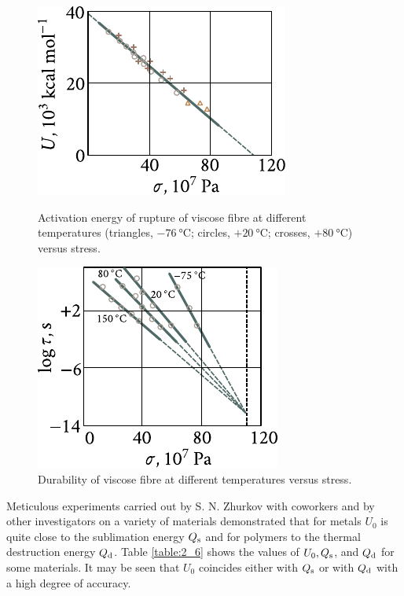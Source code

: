 \begin{figure}[t]
	\begin{minipage}[t]{0.48\linewidth}
		\begin{center}
			\includegraphics[scale=1]{figures/ch_02/fig_2_30.pdf}
			\caption[]{Activation energy of rupture of viscose fibre at different temperatures (triangles, $-\SI{76}{\degreeCelsius}$; circles, $+\SI{20}{\degreeCelsius}$; crosses, $+\SI{80}{\degreeCelsius}$) versus stress.}
			\label{fig:2_30}
		\end{center}
	\end{minipage}
	\hfill{ }%
	\begin{minipage}[t]{0.48\linewidth}
		\begin{center}
			\includegraphics[scale=1]{figures/ch_02/fig_2_31.pdf}
			\caption[]{Durability of viscose fibre at different temperatures versus stress.}
			\label{fig:2_31}
		\end{center}
	\end{minipage}
\vspace{-0.3cm}
\end{figure}

Meticulous experiments carried out by S. N. Zhurkov with coworkers and by other investigators on a variety of materials demonstrated that for metals $U_0$ is quite close to the sublimation energy $Q_{\text{s}}$ and for polymers to the thermal destruction energy $Q_{\text{d}}$. Table \ref{table:2_6} shows the values of $U_0, Q_{\text{s}}$, and $Q_{\text{d}}$ for some materials. It may be seen that $U_0$ coincides either with $Q_{\text{s}}$ or with $Q_{\text{d}}$ with a high degree of accuracy.

